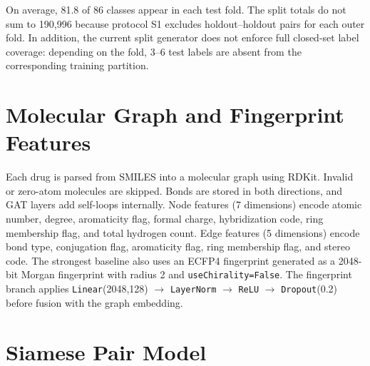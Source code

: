 \documentclass[11pt,a4paper]{report}
\begin{document}
On average, 81.8 of 86 classes appear in each test fold. The split totals do not sum to 190{,}996 because protocol S1 excludes holdout--holdout pairs for each outer fold. In addition, the current split generator does not enforce full closed-set label coverage: depending on the fold, 3--6 test labels are absent from the corresponding training partition.

\section{Molecular Graph and Fingerprint Features}

Each drug is parsed from SMILES into a molecular graph using RDKit. Invalid or zero-atom molecules are skipped. Bonds are stored in both directions, and GAT layers add self-loops internally. Node features (7 dimensions) encode atomic number, degree, aromaticity flag, formal charge, hybridization code, ring membership flag, and total hydrogen count. Edge features (5 dimensions) encode bond type, conjugation flag, aromaticity flag, ring membership flag, and stereo code. The strongest baseline also uses an ECFP4 fingerprint generated as a 2048-bit Morgan fingerprint with radius 2 and \texttt{useChirality=False}. The fingerprint branch applies \texttt{Linear}(2048,128) \(\rightarrow\) \texttt{LayerNorm} \(\rightarrow\) \texttt{ReLU} \(\rightarrow\) \texttt{Dropout}(0.2) before fusion with the graph embedding.

\section{Siamese Pair Model}
\end{document}
